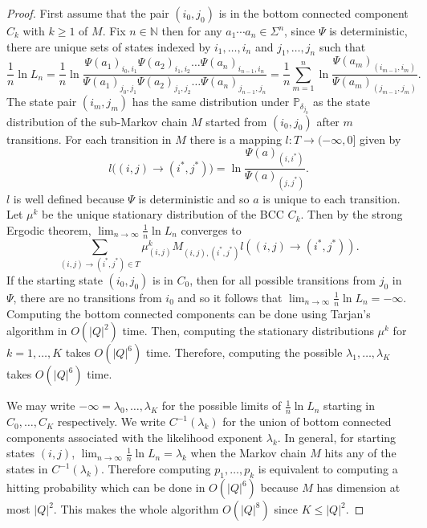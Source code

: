 \documentclass[a4paper,UKenglish,cleveref, autoref,mathscr]{lipics-v2019}
\newcommand{\NN}{\mathbb{N}}
\newcommand{\PP}{\mathbb{P}}
\newcommand{\1}{\mathbbm{1}}
\newcommand{\liexp}{\lim_{n\rightarrow\infty} \frac1n \ln L_n}
\begin{document}
\begin{proof}
First assume that the pair $(i_0, j_0)$ is in the bottom connected component $C_k$ with $k \geq 1$ of $M$. Fix $n\in\NN$ then for any $a_1\cdots a_n \in \Sigma^n$, since $\Psi$ is deterministic, there are unique sets of states indexed by $i_1, \dots, i_n$ and $j_1, \dots, j_n$ such that
\begin{equation*}
\frac1n \ln L_n = \frac1n \ln \frac{\Psi(a_1)_{i_0, i_1} \Psi(a_2)_{i_1, i_2} \dots \Psi(a_n)_{i_{n-1}, i_n}}{\Psi(a_1)_{j_0, j_1} \Psi(a_2)_{j_1, j_2} \dots \Psi(a_n)_{j_{n-1}, j_n}} = \frac1n \sum_{m = 1}^n \ln \frac{\Psi(a_m)_{(i_{m - 1}, i_m)}}{\Psi(a_m)_{(j_{m - 1}, j_m)}}.
\end{equation*}
The state pair $(i_m, j_m)$ has the same distribution under $\PP_{\delta_{j_0}}$ as the state distribution of the sub-Markov chain $M$ started from $(i_0 , j_0)$ after $m$ transitions. For each transition in $M$ there is a mapping $l : T  \rightarrow (-\infty, 0]$ given by
\begin{equation*}
l\big( (i,j) \rightarrow (i^*, j^*) \big) = \ln \frac{\Psi(a)_{(i, i^*)}}{\Psi(a)_{(j, j^*)}}.
\end{equation*}
$l$ is well defined because $\Psi$ is deterministic and so $a$ is unique to each transition. Let $\mu^k$ be the unique stationary distribution of the BCC $C_k$. Then by the strong Ergodic theorem, $\liexp$ converges to 
\begin{equation*}
\sum_{(i, j) \rightarrow (i^*, j^*) \in T} \mu^k_{(i, j)} M_{(i,j), (i^*, j^*)} l((i, j) \rightarrow (i^*, j^*)).
\end{equation*}
If the starting state $(i_0, j_0)$ is in $C_0$, then for all possible transitions from $j_0$ in $\Psi$, there are no transitions from $i_0$ and so it follows that $\liexp = -\infty$. Computing the bottom connected components can be done using Tarjan's algorithm in $O(|Q|^2)$ time. Then, computing the stationary distributions $\mu^k$ for $k = 1, \dots, K$ takes $O(|Q|^6)$ time. Therefore, computing the possible $\lambda_1, \dots, \lambda_K$ takes $O(|Q|^6)$ time.

We may write $-\infty = \lambda_0, \dots, \lambda_K$ for the possible limits of $\frac1n \ln L_n$ starting in $C_0, \dots, C_K$ respectively. We write $C^{-1}(\lambda_k)$ for the union of bottom connected components associated with the likelihood exponent $\lambda_k$. In general, for starting states $(i,j)$, $\liexp = \lambda_k$ when the Markov chain $M$ hits any of the states in $C^{-1}(\lambda_k)$. Therefore computing $p_1, \dots, p_k$ is equivalent to computing a hitting probability which can be done in $O(|Q|^6)$ because $M$ has dimension at most $|Q|^2$. This makes the whole algorithm $O(|Q|^8)$ since $K \leq |Q|^2$.
\end{proof}
\end{document}
